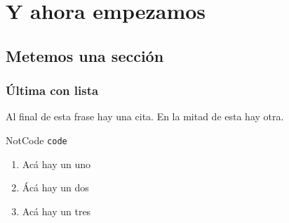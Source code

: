 

\chapter{Y ahora empezamos}
\section{Metemos una sección}
\subsection{Última con lista}

Al final de esta frase hay una cita.\cite{citalibro}
En la mitad\cite{citaarticulo} de esta hay otra.

NotCode {\tt code}
\begin{enumerate}
\item Acá hay un uno
\item Ácá hay un dos
\item Acá hay un tres
\end{enumerate}



